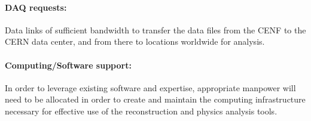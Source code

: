 \paragraph{DAQ requests:}  Data links of sufficient bandwidth to transfer the data files from the CENF to the CERN data center, and from there to locations worldwide for analysis. \\

\paragraph{Computing/Software support:} In order to leverage existing software and expertise, appropriate manpower will need to be allocated in order to create and maintain the computing infrastructure necessary for effective use of the reconstruction and physics analysis tools.\\



